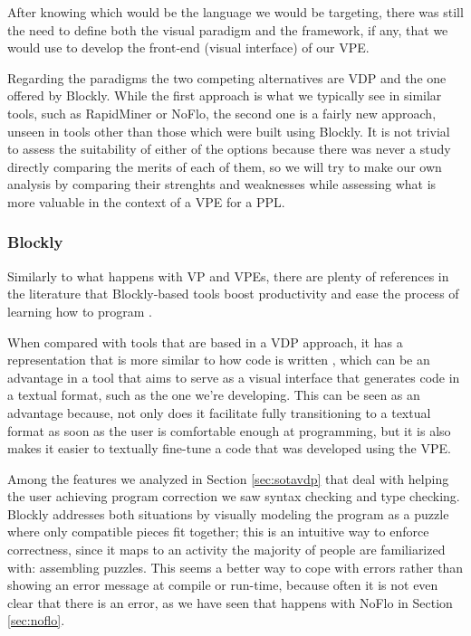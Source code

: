 After knowing which would be the language we would be targeting, there was still
the need to define both the visual paradigm and the framework, if any, that we
would use to develop the front-end (visual interface) of our VPE.

Regarding the paradigms the two competing alternatives are VDP and the one offered
by Blockly. While the first approach is what we typically see in similar tools,
such as RapidMiner or NoFlo, the second one is a fairly new approach, unseen
in tools other than those which were built using Blockly. It is not trivial to
assess the suitability of either of the options because there was never a study
directly comparing the merits of each of them, so we will try to make our own
analysis by comparing their strenghts and weaknesses while assessing what is
more valuable in the context of a VPE for a PPL.

\subsubsection{Blockly}
\label{sec:fblock}

Similarly to what happens with VP and VPEs, there are plenty of references
in the literature that Blockly-based tools boost productivity \cite{Marron2012} and ease the process
of learning how to program \cite{Junior2006}.

When compared with tools that are
based in a VDP approach, it has a representation that is more similar to how code
is written \cite{blockly}, which can be an advantage in a tool that aims to serve as a visual
interface that generates code in a textual format, such as the one we're developing.
This can be seen as an advantage because, not only does it facilitate fully transitioning
to a textual format as soon as the user is comfortable enough at programming,
but it is also makes it easier to textually fine-tune a code that was developed
using the VPE.

Among the features we analyzed in Section \ref{sec:sotavdp} that deal with
helping the user achieving program correction we saw syntax checking and type
checking. Blockly addresses both situations by visually modeling the program
as a puzzle where only compatible pieces fit together; this is an intuitive way
to enforce correctness, since it maps to an activity the majority of people are
familiarized with: assembling puzzles. This seems a better way to cope with errors
rather than showing an error message at compile or run-time, because often it is
not even clear that there is an error, as we have seen that happens with NoFlo in
Section \ref{sec:noflo}.

